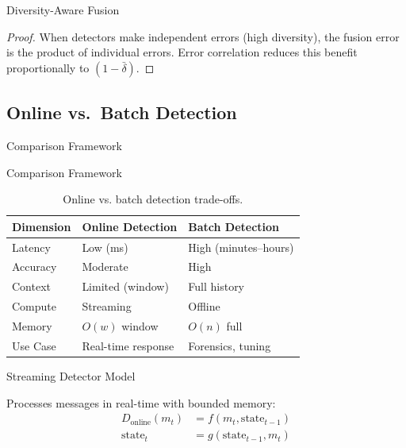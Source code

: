 \documentclass[
  ignorenonframetext,
]{beamer}
\begin{document}
\begin{frame}[allowframebreaks]{Diversity-Aware Fusion}
\begin{proof}
When detectors make independent errors (high diversity), the fusion error is the product of individual errors. Error correlation reduces this benefit proportionally to $(1 - \bar{\delta})$.
\end{proof}
\end{frame}

\subsection{Online vs.~Batch Detection}\label{sec:online-batch}

\begin{frame}[allowframebreaks]{Comparison Framework}
\protect{}\label{comparison-framework}
\end{frame}

\begin{frame}[allowframebreaks]{Comparison Framework}
\begin{table}[htbp]
\centering
\caption{Online vs. batch detection trade-offs.}
\label{tab:online-batch-comparison}
\begin{tabular}{@{}lll@{}}
\toprule
Dimension & Online Detection & Batch Detection \\
\midrule
Latency & Low (ms) & High (minutes--hours) \\
Accuracy & Moderate & High \\
Context & Limited (window) & Full history \\
Compute & Streaming & Offline \\
Memory & $O(w)$ window & $O(n)$ full \\
Use Case & Real-time response & Forensics, tuning \\
\bottomrule
\end{tabular}
\end{table}
\end{frame}

\begin{frame}[allowframebreaks]{Streaming Detector Model}
\protect{}\label{streaming-detector-model}
\begin{definition}
\label{def:streaming-detector}
Processes messages in real-time with bounded memory:
\begin{align}
\label{eq:streaming-output}
D_{\text{online}}(m_t) &= f(m_t, \text{state}_{t-1}) \\
\label{eq:streaming-state}
\text{state}_t &= g(\text{state}_{t-1}, m_t)
\end{align}
\end{definition}
\end{frame}
\end{document}

